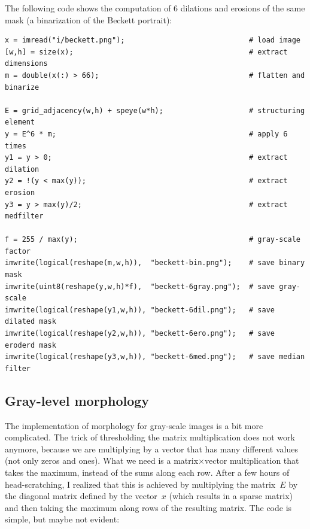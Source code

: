 The following code shows the computation of 6 dilations and erosions of the
same mask (a binarization of the Beckett portrait):

\begin{verbatim}
x = imread("i/beckett.png");                             # load image
[w,h] = size(x);                                         # extract dimensions
m = double(x(:) > 66);                                   # flatten and binarize

E = grid_adjacency(w,h) + speye(w*h);                    # structuring element
y = E^6 * m;                                             # apply 6 times
y1 = y > 0;                                              # extract dilation
y2 = !(y < max(y));                                      # extract erosion
y3 = y > max(y)/2;                                       # extract medfilter

f = 255 / max(y);                                        # gray-scale factor
imwrite(logical(reshape(m,w,h)),  "beckett-bin.png");    # save binary mask
imwrite(uint8(reshape(y,w,h)*f),  "beckett-6gray.png");  # save gray-scale
imwrite(logical(reshape(y1,w,h)), "beckett-6dil.png");   # save dilated mask
imwrite(logical(reshape(y2,w,h)), "beckett-6ero.png");   # save eroderd mask
imwrite(logical(reshape(y3,w,h)), "beckett-6med.png");   # save median filter
\end{verbatim}

\begin{gallery}
\end{gallery}

\subsection{Gray-level morphology}


The implementation of morphology for gray-scale images is a bit more
complicated.  The trick of thresholding the matrix multiplication does not
work anymore, because we are multiplying by a vector that has many different
values (not only zeros and ones).  What we need is a matrix$\times$vector
multiplication that takes the maximum, instead of the sums along each row.
After a few hours of head-scratching, I realized that this is achieved by
multiplying the matrix~$E$ by the diagonal matrix defined by the vector~$x$
(which results in a sparse matrix) and then taking the maximum along rows of
the resulting matrix.  The code is simple, but maybe not evident:

